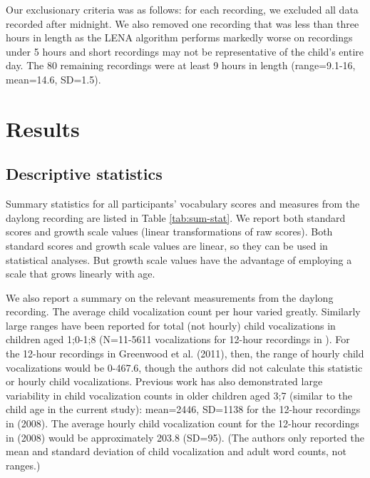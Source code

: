 \documentclass[a4paper,man,natbib,donotrepeattitle, apacite]{apa6}
\begin{document}
Our exclusionary criteria was as follows: for each recording, we excluded all data recorded after midnight. We also removed one recording that was less than three hours in length as the LENA algorithm performs markedly worse on recordings under 5 hours \cite{xuReliabilityLENALanguage2009} and short recordings may not be representative of the child’s entire day. The 80 remaining recordings were at least 9 hours in length (range=9.1-16, mean=14.6, SD=1.5).

\section{Results}

\subsection{Descriptive statistics}

Summary statistics for all participants’ vocabulary scores and measures from the daylong recording are listed in Table \ref{tab:sum-stat}. We report both standard scores and growth scale values (linear transformations of raw scores). Both standard scores and growth scale values are linear, so they can be used in statistical analyses. But growth scale values have the advantage of employing a scale that grows linearly with age.

We also report a summary on the relevant measurements from the daylong recording. The average child vocalization count per hour varied greatly. Similarly large ranges have been reported for total (not hourly) child vocalizations in children aged 1;0-1;8 (N=11-5611 vocalizations for 12-hour recordings in ). For the 12-hour recordings in Greenwood et al. (2011), then, the range of hourly child vocalizations would be 0-467.6, though the authors did not calculate this statistic or hourly child vocalizations. Previous work has also demonstrated large variability in child vocalization counts in older children aged 3;7 (similar to the child age in the current study): mean=2446, SD=1138 for the 12-hour recordings in \citeauthor{gilkersonLENANaturalLanguage2008} (2008). The average hourly child vocalization count for the 12-hour recordings in \citeauthor{gilkersonLENANaturalLanguage2008} (2008) would be approximately 203.8 (SD=95). (The authors only reported the mean and standard deviation of child vocalization and adult word counts, not ranges.) 
\end{document}
